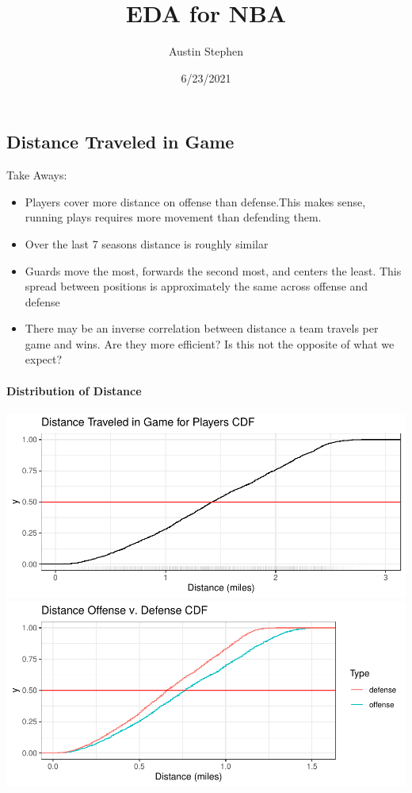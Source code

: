 \documentclass[
]{article}
\title{EDA for NBA}
\author{Austin Stephen}
\date{6/23/2021}
\providecommand{\tightlist}{%
  \setlength{\itemsep}{0pt}\setlength{\parskip}{0pt}}
\begin{document}
\maketitle

\hypertarget{distance-traveled-in-game}{%
\subsection{Distance Traveled in Game}\label{distance-traveled-in-game}}

Take Aways:

\begin{itemize}
\tightlist
\item
  Players cover more distance on offense than defense.This makes sense,
  running plays requires more movement than defending them.
\item
  Over the last 7 seasons distance is roughly similar\\
\item
  Guards move the most, forwards the second most, and centers the least.
  This spread between positions is approximately the same across offense
  and defense
\item
  There may be an inverse correlation between distance a team travels
  per game and wins. Are they more efficient? Is this not the opposite
  of what we expect?
\end{itemize}

\hypertarget{distribution-of-distance}{%
\paragraph{Distribution of Distance}\label{distribution-of-distance}}

\includegraphics{EDA_files/figure-latex/unnamed-chunk-1-1.pdf}
\includegraphics{EDA_files/figure-latex/unnamed-chunk-1-2.pdf}
\end{document}
